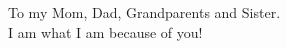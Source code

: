 %
\begin{frontmatter}

%
%
\makefrontmatter

%
%
%
%
%
%
\begin{dedication}
To my Mom, Dad, Grandparents and Sister.\\ I am what I am because of you!
\end{dedication}


%
%



%
%

%



\end{frontmatter}
